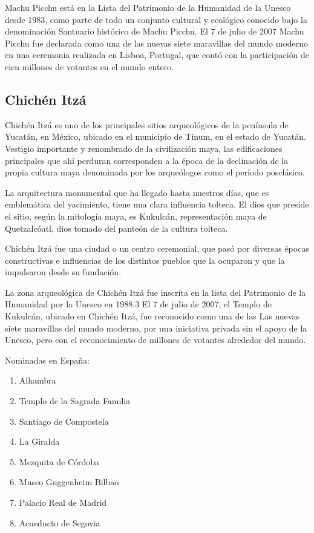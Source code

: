 \documentclass[a4paper,12pt]{article}
\begin{document}
Machu Picchu está en la Lista del Patrimonio de la Humanidad de la Unesco desde 1983, como parte de todo un conjunto cultural y ecológico conocido bajo la denominación Santuario histórico de Machu Picchu. El 7 de julio de 2007 Machu Picchu fue declarada como una de las nuevas siete maravillas del mundo moderno en una ceremonia realizada en Lisboa, Portugal, que contó con la participación de cien millones de votantes en el mundo entero.
 \subsection{Chichén Itzá}
Chichén Itzá es uno de los principales sitios arqueológicos de la península de Yucatán, en México, ubicado en el municipio de Tinum, en el estado de Yucatán. Vestigio importante y renombrado de la civilización maya, las edificaciones principales que ahí perduran corresponden a la época de la declinación de la propia cultura maya denominada por los arqueólogos como el período posclásico.

La arquitectura monumental que ha llegado hasta nuestros días, que es emblemática del yacimiento, tiene una clara influencia tolteca. El dios que preside el sitio, según la mitología maya, es Kukulcán, representación maya de Quetzalcóatl, dios tomado del panteón de la cultura tolteca.

Chichén Itzá fue una ciudad o un centro ceremonial, que pasó por diversas épocas constructivas e influencias de los distintos pueblos que la ocuparon y que la impulsaron desde su fundación.

La zona arqueológica de Chichén Itzá fue inscrita en la lista del Patrimonio de la Humanidad por la Unesco en 1988.3 El 7 de julio de 2007, el Templo de Kukulcán, ubicado en Chichén Itzá, fue reconocido como una de las Las nuevas siete maravillas del mundo moderno, por una iniciativa privada sin el apoyo de la Unesco, pero con el reconocimiento de millones de votantes alrededor del mundo.
 \\

\begin{bf} 
Nominadas en España:
\end{bf} 

\begin{enumerate}
 \item Alhambra
 \item Templo de la Sagrada Familia
 \item Santiago de Compostela
 \item La Giralda
 \item Mezquita de Córdoba
 \item Museo Guggenheim Bilbao
 \item Palacio Real de Madrid
 \item Acueducto de Segovia
\end{enumerate}
\end{document}
